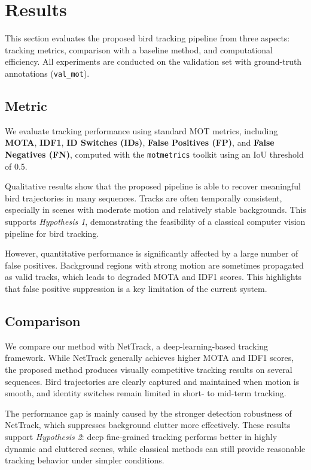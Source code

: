 \section{Results}

This section evaluates the proposed bird tracking pipeline from three aspects:
tracking metrics, comparison with a baseline method, and computational efficiency.
All experiments are conducted on the validation set with ground-truth annotations
(\texttt{val\_mot}).

\subsection{Metric}
\label{subsec:metric}

We evaluate tracking performance using standard MOT metrics, including
\textbf{MOTA}, \textbf{IDF1}, \textbf{ID Switches (IDs)}, \textbf{False Positives (FP)},
and \textbf{False Negatives (FN)}, computed with the \texttt{motmetrics} toolkit
using an IoU threshold of 0.5.

Qualitative results show that the proposed pipeline is able to recover meaningful
bird trajectories in many sequences.
Tracks are often temporally consistent, especially in scenes with moderate motion
and relatively stable backgrounds.
This supports \textit{Hypothesis 1}, demonstrating the feasibility of a classical
computer vision pipeline for bird tracking.

However, quantitative performance is significantly affected by a large number of
false positives.
Background regions with strong motion are sometimes propagated as valid tracks,
which leads to degraded MOTA and IDF1 scores.
This highlights that false positive suppression is a key limitation of the current system.

\subsection{Comparison}
\label{subsec:comparison}

We compare our method with NetTrack, a deep-learning-based tracking framework.
While NetTrack generally achieves higher MOTA and IDF1 scores, the proposed method
produces visually competitive tracking results on several sequences.
Bird trajectories are clearly captured and maintained when motion is smooth,
and identity switches remain limited in short- to mid-term tracking.

The performance gap is mainly caused by the stronger detection robustness of NetTrack,
which suppresses background clutter more effectively.
These results support \textit{Hypothesis 2}: deep fine-grained tracking performs better
in highly dynamic and cluttered scenes, while classical methods can still provide
reasonable tracking behavior under simpler conditions.

